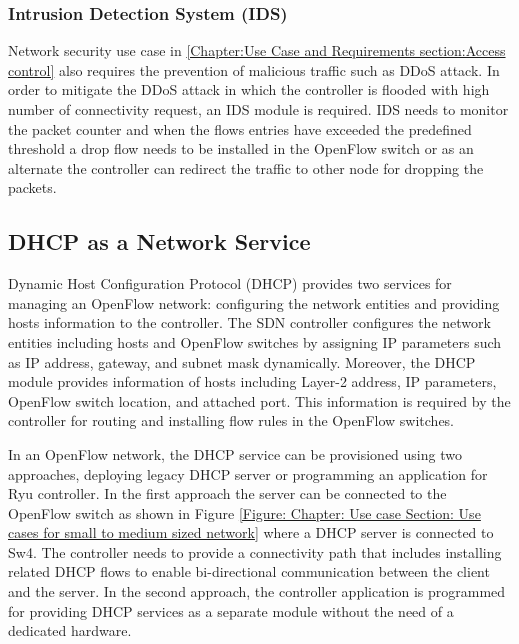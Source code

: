 \subsubsection{Intrusion Detection System (IDS)}
Network security use case in \ref{Chapter:Use Case and Requirements section:Access control} also requires the prevention of malicious traffic such as DDoS attack. In order to mitigate the DDoS attack in which the controller is flooded with high number of connectivity request, an IDS module is required. IDS needs to monitor the packet counter and when the flows entries have exceeded the predefined threshold a drop flow needs to be installed in the OpenFlow switch or as an alternate the controller can redirect the traffic to other node for dropping the packets. 

\subsection{DHCP as a Network Service}

Dynamic Host Configuration Protocol (DHCP) provides two services for managing an OpenFlow network: configuring the network entities and providing hosts information to the controller. The SDN controller configures the network entities including hosts and OpenFlow switches by assigning IP parameters such as IP address, gateway, and subnet mask dynamically. Moreover, the DHCP module provides information of hosts including Layer-2 address, IP parameters, OpenFlow switch location, and attached port. This information is required by the controller for routing and installing flow rules in the OpenFlow switches. 

In an OpenFlow network, the DHCP service can be provisioned using two approaches, deploying legacy DHCP server or programming an application for Ryu controller. In the first approach the server can be connected to the OpenFlow switch as shown in Figure \ref{Figure: Chapter: Use case Section: Use cases for small to medium sized network} where a DHCP server is connected to Sw4. The controller needs to provide a connectivity path that includes installing related DHCP flows to enable bi-directional communication between the client and the server. In the second approach, the controller application is programmed for providing DHCP services as a separate module without the need of a dedicated hardware.


